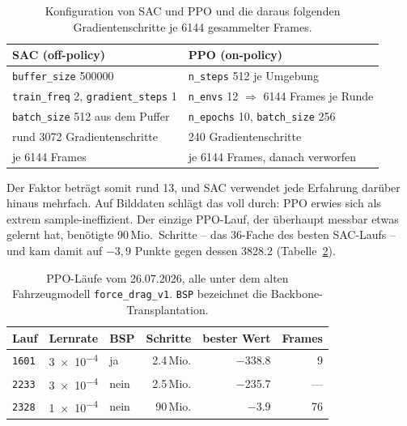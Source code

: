 \begin{table}[htbp]
\centering
\caption{Konfiguration von \ac{SAC} und \ac{PPO} und die daraus folgenden Gradientenschritte je \num{6144} gesammelter Frames.}
\label{tab:sac_ppo_konfig}
\begin{tabular}{@{}l l@{}}
  \toprule
  \textbf{SAC (off-policy)} & \textbf{PPO (on-policy)} \\
  \midrule
  \texttt{buffer\_size} \num{500000} & \texttt{n\_steps} \num{512} je Umgebung \\
  \texttt{train\_freq} \num{2}, \texttt{gradient\_steps} \num{1} & \texttt{n\_envs} \num{12} $\Rightarrow$ \num{6144} Frames je Runde \\
  \texttt{batch\_size} \num{512} aus dem Puffer & \texttt{n\_epochs} \num{10}, \texttt{batch\_size} \num{256} \\
  \midrule
  rund \num{3072} Gradientenschritte & \num{240} Gradientenschritte \\
  je \num{6144} Frames & je \num{6144} Frames, danach verworfen \\
  \bottomrule
\end{tabular}
\end{table}

Der Faktor beträgt somit rund \num{13}, und \ac{SAC} verwendet jede Erfahrung darüber hinaus mehrfach. Auf Bilddaten schlägt das voll durch: \ac{PPO} erwies sich als extrem sample-ineffizient. Der einzige \ac{PPO}-Lauf, der überhaupt messbar etwas gelernt hat, benötigte \num{90}\,Mio.\ Schritte -- das 36-Fache des besten \ac{SAC}-Laufs -- und kam damit auf $-3{,}9$ Punkte gegen dessen \num{3828.2} (Tabelle~\ref{tab:ppo_laeufe}).

\begin{table}[htbp]
  \centering
  \caption{PPO-Läufe vom 26.07.2026, alle unter dem alten Fahrzeugmodell \texttt{force\_drag\_v1}. \texttt{BSP} bezeichnet die Backbone-Transplantation.}
  \label{tab:ppo_laeufe}
  \small
  \begin{tabular}{@{}l l l r r r@{}}
    \toprule
    \textbf{Lauf} & \textbf{Lernrate} & \textbf{BSP} & \textbf{Schritte} & \textbf{bester Wert} & \textbf{Frames} \\
    \midrule
    \texttt{1601} & \num{3e-4} & ja   & \num{2.4}\,Mio.  & \num{-338.8} & \num{9}  \\
    \texttt{2233} & \num{3e-4} & nein & \num{2.5}\,Mio.  & \num{-235.7} & ---      \\
    \texttt{2328} & \num{1e-4} & nein & \num{90}\,Mio.   & \num{-3.9}   & \num{76} \\
    \bottomrule
  \end{tabular}
\end{table}

